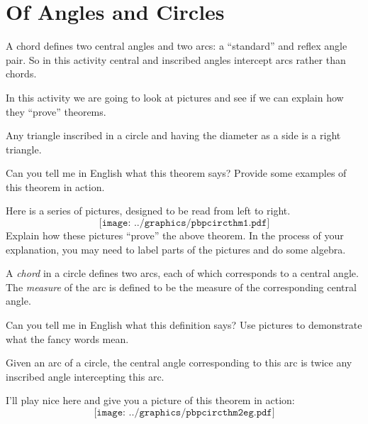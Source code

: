 \newpage
\section{Of Angles and Circles} %

\begin{teachingnote}
A chord defines two central angles and two arcs: a ``standard'' and reflex angle pair.  So in this activity central and inscribed angles intercept arcs rather than chords.
\end{teachingnote}

In this activity we are going to look at pictures and see if we can
explain how they ``prove'' theorems.

\begin{theorem} 
Any triangle inscribed in a circle and having the diameter as a side is a
right triangle.
\end{theorem}

\begin{prob}
Can you tell me in English what this theorem says? Provide some
examples of this theorem in action.
\end{prob}

\begin{prob} 
Here is a series of pictures, designed to be read from left to right.
\[
\texttt{[image: ../graphics/pbpcircthm1.pdf]}
\]
Explain how these pictures ``prove'' the above theorem. In the process
of your explanation, you may need to label parts of the pictures and
do some algebra.
\end{prob}

\begin{definition}
A \emph{chord} in a circle defines two {arcs}, each of which corresponds to a {central angle}.  The \emph{measure} of the arc is defined to be the measure of the corresponding central angle.  
\end{definition}

\begin{prob}
Can you tell me in English what this definition says? Use pictures to demonstrate what the fancy words mean.  
\end{prob}

\begin{theorem} 
Given an arc of a circle, the central angle corresponding to this arc is
twice any inscribed angle intercepting this arc.
\end{theorem}

I'll play nice here and give you a picture of this theorem in action:
\[
\texttt{[image: ../graphics/pbpcircthm2eg.pdf]}
\]

